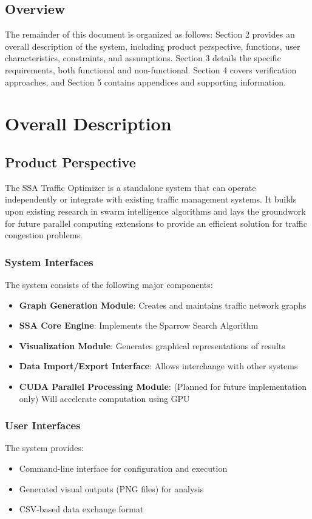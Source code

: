 \documentclass[conference]{IEEEtran}
\begin{document}
\subsection{Overview}
The remainder of this document is organized as follows: Section 2 provides an overall description of the system, including product perspective, functions, user characteristics, constraints, and assumptions. Section 3 details the specific requirements, both functional and non-functional. Section 4 covers verification approaches, and Section 5 contains appendices and supporting information.

\section{Overall Description}

\subsection{Product Perspective}
The SSA Traffic Optimizer is a standalone system that can operate independently or integrate with existing traffic management systems. It builds upon existing research in swarm intelligence algorithms and lays the groundwork for future parallel computing extensions to provide an efficient solution for traffic congestion problems.

\subsubsection{System Interfaces}
The system consists of the following major components:
\begin{itemize}
    \item \textbf{Graph Generation Module}: Creates and maintains traffic network graphs
    \item \textbf{SSA Core Engine}: Implements the Sparrow Search Algorithm
    \item \textbf{Visualization Module}: Generates graphical representations of results
    \item \textbf{Data Import/Export Interface}: Allows interchange with other systems
    \item \textbf{CUDA Parallel Processing Module}: (Planned for future implementation only) Will accelerate computation using GPU
\end{itemize}

\subsubsection{User Interfaces}
The system provides:
\begin{itemize}
    \item Command-line interface for configuration and execution
    \item Generated visual outputs (PNG files) for analysis
    \item CSV-based data exchange format
\end{itemize}
\end{document}
